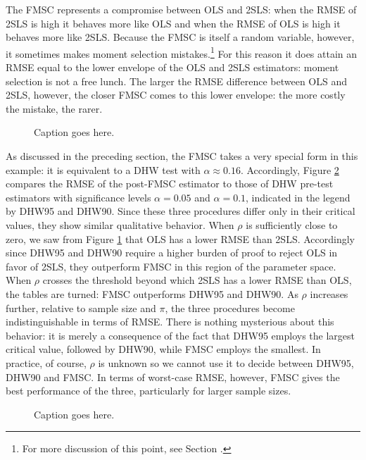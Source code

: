 The FMSC represents a compromise between OLS and 2SLS: when the RMSE of 2SLS is high it behaves more like OLS and when the RMSE of OLS is high it behaves more like 2SLS.
Because the FMSC is itself a random variable, however, it sometimes makes moment selection mistakes.\footnote{For more discussion of this point, see Section \label{sec:avg}.} 
For this reason it does attain an RMSE equal to the lower envelope of the OLS and 2SLS estimators: moment selection is not a free lunch.
The larger the RMSE difference between OLS and 2SLS, however, the closer FMSC comes to this lower envelope: the more costly the mistake, the rarer.

\begin{figure}
\centering
	
	\caption{Caption goes here.}
	\label{fig:OLSvsIV_RMSEbaseline}
\end{figure}

As discussed in the preceding section, the FMSC takes a very special form in this example: it is equivalent to a DHW test with $\alpha \approx 0.16$.
Accordingly, Figure \ref{fig:OLSvsIV_RMSEvsDHW} compares the RMSE of the post-FMSC estimator to those of DHW pre-test estimators with significance levels $\alpha = 0.05$ and $\alpha = 0.1$, indicated in the legend by DHW95 and DHW90.
Since these three procedures differ only in their critical values, they show similar qualitative behavior.
When $\rho$ is sufficiently close to zero, we saw from Figure \ref{fig:OLSvsIV_RMSEbaseline} that OLS has a lower RMSE than 2SLS.
Accordingly since DHW95 and DHW90 require a higher burden of proof to reject OLS in favor of 2SLS, they outperform FMSC in this region of the parameter space.
When $\rho$ crosses the threshold beyond which 2SLS has a lower RMSE than OLS, the tables are turned: FMSC outperforms DHW95 and DHW90.
As $\rho$ increases further, relative to sample size and $\pi$, the three procedures become indistinguishable in terms of RMSE.
There is nothing mysterious about this behavior: it is merely a consequence of the fact that DHW95 employs the largest critical value, followed by DHW90, while FMSC employs the smallest.
In practice, of course, $\rho$ is unknown so we cannot use it to decide between DHW95, DHW90 and FMSC.
In terms of worst-case RMSE, however, FMSC gives the best performance of the three, particularly for larger sample sizes. 

\begin{figure}
\centering
	
	\caption{Caption goes here.}
	\label{fig:OLSvsIV_RMSEvsDHW}
\end{figure}
